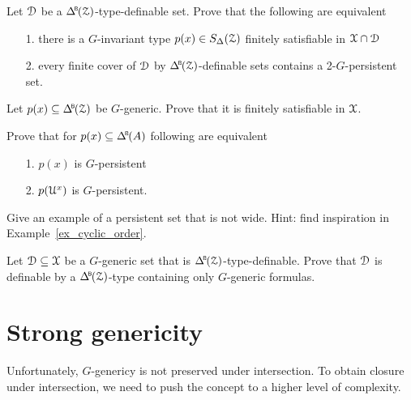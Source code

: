 \begin{exercise}
  Let $\EuScript D$ be a $\BDelta({\Z})$-type-definable set.
  Prove that the following are equivalent 
  \begin{itemize}
    \item[1.] there is a $G$-invariant type $p(x)\in S_\Delta(\EuScript Z)$ finitely satisfiable in $\EuScript X\cap\EuScript D$
    \item[2.] every finite cover of $\EuScript D$ by $\BDelta({\Z})$-definable sets contains a 2-$G$-persistent set.
  \end{itemize}
\end{exercise}

\begin{exercise}\label{ex_gen_sat}
  Let $p(x)\subseteq \BDelta(\Z)$ be $G$-generic.
  Prove that it is finitely satisfiable in $\EuScript X$.
\end{exercise}

\begin{exercise}\label{ex_persistent_types}
  Prove that for $p(x)\subseteq \BDelta(A)$ following are equivalent
  \begin{itemize}
    \item[1.] $p(x)$ is $G$-persistent
    \item[2.] $p(\EuScript U^x)$ is $G$-persistent.
  \end{itemize}
\end{exercise}

\begin{exercise}
  Give an example of a persistent set that is not wide.
  Hint: find inspiration in Example~\ref{ex_cyclic_order}.
\end{exercise}

\begin{exercise}\label{ex_generic_type_vs_formulas}
  Let $\EuScript D\subseteq\EuScript X$ be a $G$-generic set that is $\BDelta(\Z)$-type-definable.
  Prove that $\EuScript D$ is definable by a $\BDelta(\Z)$-type containing only $G$-generic formulas.
\end{exercise}

\section{Strong genericity}\label{strong_genericity}

Unfortunately, $G$-genericy is not preserved under intersection.
To obtain closure under intersection, we need to push the concept to a higher level of complexity.

